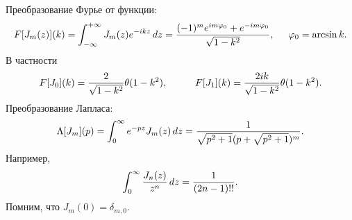 Преобразование Фурье от функции:
\begin{equation*}
    F[J_m (z)] (k) = \int_{-\infty}^{+\infty} J_m (z) e^{-ikz} \, d z 
    = \frac{(-1)^m e^{i m \varphi_0} + e^{- i m \varphi_0}}{\sqrt{1 - k^2}}, \hspace{5 mm} 
    \varphi_0 = \arcsin k.
\end{equation*}
В частности
\begin{equation*}
    F[J_0](k) = \frac{2}{\sqrt{1-k^2}} \theta(1-k^2), \hspace{10 mm} 
    F[J_1](k) = \frac{2 i k}{\sqrt{1 - k^2}} \theta(1-k^2).
\end{equation*}
Преобразование Лапласа:
\begin{equation*}
    \Lambda[J_m] (p)=  \int_{0}^{\infty}  e^{- p z} J_m (z) \, d z = 
    \frac{1}{\sqrt{p^2 + 1} (p + \sqrt{p^2 + 1})^m}.
\end{equation*}
Например,
\begin{equation*}
    \int_{0}^{\infty} \frac{J_n (z)}{z^n} \, d z = \frac{1}{(2n-1)!!}.
\end{equation*}
Помним, что $J_m(0) = \delta_{m,0}$.

